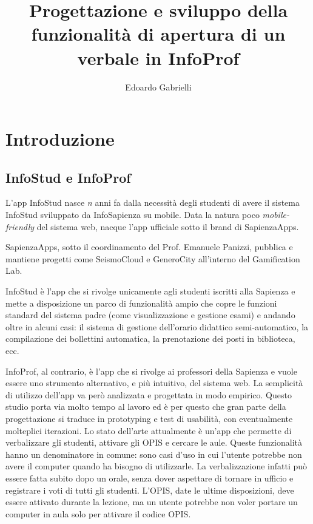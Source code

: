\documentclass[Lau, oneside]{sapthesis}%
\title{Progettazione e sviluppo della funzionalità di apertura di un verbale in InfoProf}
\author{Edoardo Gabrielli}
\begin{document}
\frontmatter
\maketitle

\tableofcontents

\mainmatter
\chapter{Introduzione}
\label{ch:1}

\section{InfoStud e InfoProf}
\label{sec:pres}
L'app InfoStud nasce \textit{n} anni fa dalla necessità degli studenti di avere il sistema InfoStud sviluppato da InfoSapienza su mobile.
Data la natura poco \textit{mobile-friendly} del sistema web, nacque l'app ufficiale sotto il brand di SapienzaApps.

SapienzaApps, sotto il coordinamento del Prof. Emanuele Panizzi, pubblica e mantiene progetti come SeismoCloud e GeneroCity all'interno
del Gamification Lab.

InfoStud è l'app che si rivolge unicamente agli studenti iscritti alla Sapienza e mette a disposizione un parco di funzionalità ampio
che copre le funzioni standard del sistema padre (come visualizzazione e gestione esami) e andando oltre in alcuni casi: il sistema
di gestione dell'orario didattico semi-automatico, la compilazione dei bollettini automatica, la prenotazione dei posti in biblioteca, ecc.

InfoProf, al contrario, è l'app che si rivolge ai professori della Sapienza e vuole essere uno strumento alternativo, e più intuitivo, 
del sistema web. La semplicità di utilizzo dell'app va però analizzata e progettata in modo empirico. Questo studio porta via molto tempo 
al lavoro ed è per questo che gran parte della progettazione si traduce in prototyping e test di usabilità, con eventualmente molteplici
iterazioni. Lo stato dell'arte attualmente è un'app che permette di verbalizzare gli studenti, attivare gli OPIS e cercare le aule.
Queste funzionalità hanno un denominatore in comune: sono casi d'uso in cui l'utente potrebbe non avere il computer quando ha bisogno
di utilizzarle. La verbalizzazione infatti può essere fatta subito dopo un orale, senza dover aspettare di tornare in ufficio e 
registrare i voti di tutti gli studenti. L'OPIS, date le ultime disposizioni, deve essere attivato durante la lezione, ma un utente
potrebbe non voler portare un computer in aula solo per attivare il codice OPIS.
\end{document}
